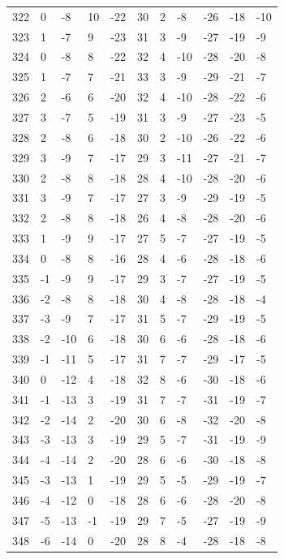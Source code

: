 \begin{table}[H]
\begin{tabular}{lllllllllll}
322 & 0 & -8 & 10 & -22 & 30 & 2 & -8 & -26 & -18 & -10 \\
323 & 1 & -7 & 9 & -23 & 31 & 3 & -9 & -27 & -19 & -9 \\
324 & 0 & -8 & 8 & -22 & 32 & 4 & -10 & -28 & -20 & -8 \\
325 & 1 & -7 & 7 & -21 & 33 & 3 & -9 & -29 & -21 & -7 \\
326 & 2 & -6 & 6 & -20 & 32 & 4 & -10 & -28 & -22 & -6 \\
327 & 3 & -7 & 5 & -19 & 31 & 3 & -9 & -27 & -23 & -5 \\
328 & 2 & -8 & 6 & -18 & 30 & 2 & -10 & -26 & -22 & -6 \\
329 & 3 & -9 & 7 & -17 & 29 & 3 & -11 & -27 & -21 & -7 \\
330 & 2 & -8 & 8 & -18 & 28 & 4 & -10 & -28 & -20 & -6 \\
331 & 3 & -9 & 7 & -17 & 27 & 3 & -9 & -29 & -19 & -5 \\
332 & 2 & -8 & 8 & -18 & 26 & 4 & -8 & -28 & -20 & -6 \\
333 & 1 & -9 & 9 & -17 & 27 & 5 & -7 & -27 & -19 & -5 \\
334 & 0 & -8 & 8 & -16 & 28 & 4 & -6 & -28 & -18 & -6 \\
335 & -1 & -9 & 9 & -17 & 29 & 3 & -7 & -27 & -19 & -5 \\
336 & -2 & -8 & 8 & -18 & 30 & 4 & -8 & -28 & -18 & -4 \\
337 & -3 & -9 & 7 & -17 & 31 & 5 & -7 & -29 & -19 & -5 \\
338 & -2 & -10 & 6 & -18 & 30 & 6 & -6 & -28 & -18 & -6 \\
339 & -1 & -11 & 5 & -17 & 31 & 7 & -7 & -29 & -17 & -5 \\
340 & 0 & -12 & 4 & -18 & 32 & 8 & -6 & -30 & -18 & -6 \\
341 & -1 & -13 & 3 & -19 & 31 & 7 & -7 & -31 & -19 & -7 \\
342 & -2 & -14 & 2 & -20 & 30 & 6 & -8 & -32 & -20 & -8 \\
343 & -3 & -13 & 3 & -19 & 29 & 5 & -7 & -31 & -19 & -9 \\
344 & -4 & -14 & 2 & -20 & 28 & 6 & -6 & -30 & -18 & -8 \\
345 & -3 & -13 & 1 & -19 & 29 & 5 & -5 & -29 & -19 & -7 \\
346 & -4 & -12 & 0 & -18 & 28 & 6 & -6 & -28 & -20 & -8 \\
347 & -5 & -13 & -1 & -19 & 29 & 7 & -5 & -27 & -19 & -9 \\
348 & -6 & -14 & 0 & -20 & 28 & 8 & -4 & -28 & -18 & -8 \\

\end{tabular}
\end{table}
